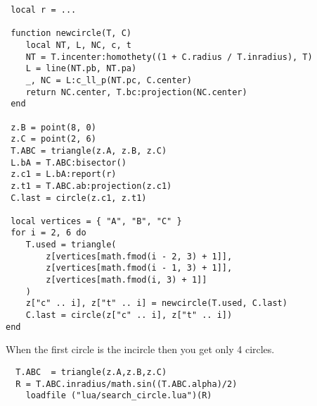 \begin{mybox}
\begin{verbatim}
 local r = ...

 function newcircle(T, C)
 	local NT, L, NC, c, t
 	NT = T.incenter:homothety((1 + C.radius / T.inradius), T)
 	L = line(NT.pb, NT.pa)
 	_, NC = L:c_ll_p(NT.pc, C.center)
 	return NC.center, T.bc:projection(NC.center)
 end

 z.B = point(8, 0)
 z.C = point(2, 6)
 T.ABC = triangle(z.A, z.B, z.C)
 L.bA = T.ABC:bisector()
 z.c1 = L.bA:report(r)
 z.t1 = T.ABC.ab:projection(z.c1)
 C.last = circle(z.c1, z.t1)

 local vertices = { "A", "B", "C" }
 for i = 2, 6 do
	T.used = triangle(
		z[vertices[math.fmod(i - 2, 3) + 1]],
		z[vertices[math.fmod(i - 1, 3) + 1]],
		z[vertices[math.fmod(i, 3) + 1]]
	)
	z["c" .. i], z["t" .. i] = newcircle(T.used, C.last)
	C.last = circle(z["c" .. i], z["t" .. i])
end
\end{verbatim}
\end{mybox}

\vspace{1em}
\begin{tkzexample}[vbox]
\end{tkzexample}

\vspace{12pt}
When the first circle is the incircle then you get only 4 circles.

\begin{mybox}
  \begin{verbatim}
  T.ABC  = triangle(z.A,z.B,z.C)
  R = T.ABC.inradius/math.sin((T.ABC.alpha)/2)
    loadfile ("lua/search_circle.lua")(R)
  \end{verbatim}
\end{mybox}

\begin{tkzexample}[vbox]

\end{tkzexample}

